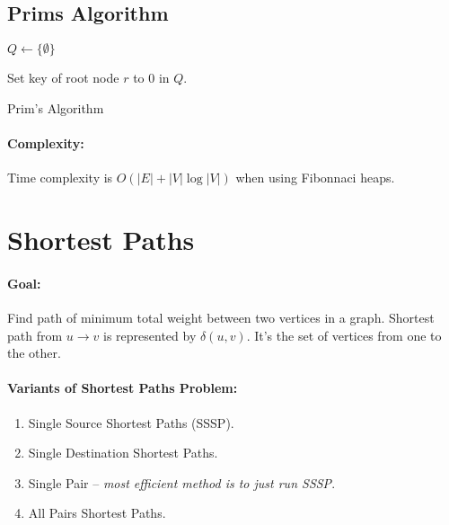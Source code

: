 \documentclass[a4paper,12pt]{report}
\begin{document}
\subsection{Prims Algorithm}

\begin{algorithm}[H]
\SetAlgoLined
{}
	\BlankLine
	\BlankLine
	$Q \leftarrow \{\emptyset\}$\;

	Set key of root node $r$ to $0$ in $Q$.


	\caption{Prim's Algorithm}
\end{algorithm}

\paragraph{Complexity: } Time complexity is $O(|E| + |V|\log |V|)$ when using Fibonnaci heaps. 








\section{Shortest Paths}

\paragraph{Goal: } Find path of minimum total weight between two vertices in a graph. Shortest path from $u\to v$ is represented by $\delta(u,v)$. It's the set of vertices from one to the other. 

\paragraph{Variants of Shortest Paths Problem: } 
\begin{enumerate}
\item Single Source Shortest Paths (SSSP).
\item Single Destination Shortest Paths.
\item Single Pair -- \textit{most efficient method is to just run SSSP}.
\item All Pairs Shortest Paths.
\end{enumerate}
\end{document}
